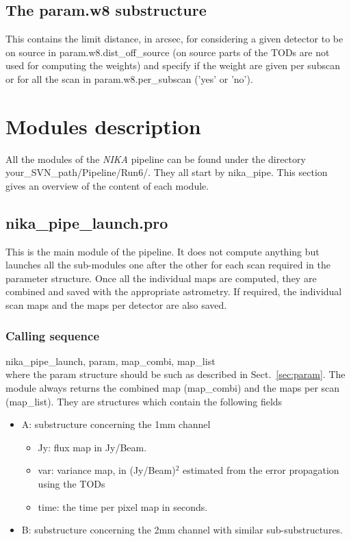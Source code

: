 \documentclass[a4paper]{article}
\begin{document}
\subsection{The param.w8 substructure }
\label{sec:param_w8}
This contains the limit distance, in arcsec, for considering a given detector to be on source in {\color{blue} param.w8.dist\_off\_source} (on source parts of the TODs are not used for computing the weights) and specify if the weight are given per subscan or for all the scan in {\color{blue} param.w8.per\_subscan} ('yes' or 'no').


\section{Modules description}
\label{sec:module_description}
All the modules of the {\it NIKA} pipeline can be found under the directory {\color{blue} your\_SVN\_path/Pipeline/Run6/}. They all start by {\color{blue} nika\_pipe}. This section gives an overview of the content of each module.

\subsection{{\color{blue}nika\_pipe\_launch.pro}}
\label{sec:nika_pipe_launch}
This is the main module of the pipeline. It does not compute anything but launches all the sub-modules one after the other for each scan required in the parameter structure. Once all the individual maps are computed, they are combined and saved with the appropriate astrometry. If required, the individual scan maps and the maps per detector are also saved.

\subsubsection*{Calling sequence}
{\color{blue} nika\_pipe\_launch, param, map\_combi, map\_list}\\
where the param structure should be such as described in Sect.~\ref{sec:param}. The module always returns the combined map (map\_combi) and the maps per scan (map\_list). They are structures which contain the following fields
\begin{itemize}
\item {\color{blue} A}: substructure concerning the 1mm channel
\begin{itemize}
\item {\color{blue} Jy}: flux map in Jy/Beam.
\item {\color{blue} var}: variance map, in (Jy/Beam)$^2$ estimated from the error propagation using the TODs
\item {\color{blue} time}: the time per pixel map in seconds.
\end{itemize}
\item {\color{blue} B}: substructure concerning the 2mm channel with similar sub-substructures.
\end{itemize}
\end{document}
